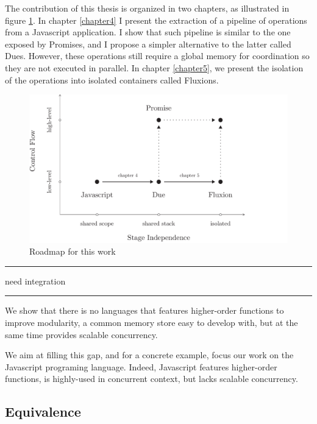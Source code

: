 The contribution of this thesis is organized in two chapters, as illustrated in figure \ref{fig:chapter3:objectives:roadmap}.
In chapter \ref{chapter4} I present the extraction of a pipeline of operations from a Javascript application.
I show that such pipeline is similar to the one exposed by Promises, and I propose a simpler alternative to the latter called Dues.
However, these operations still require a global memory for coordination so they are not executed in parallel.
In chapter \ref{chapter5}, we present the isolation of the operations into isolated containers called Fluxions. 

\begin{figure}[h!]
\includegraphics[width=1\textwidth]{../ressources/roadmap.pdf}
\caption{Roadmap for this work}
\label{fig:chapter3:objectives:roadmap}
\end{figure}

\begin{center}
\rule{3cm}{0.4pt}
need integration
\rule{3cm}{0.4pt}
\end{center}

We show that there is no languages that features higher-order functions to improve modularity, a common memory store easy to develop with, but at the same time provides scalable concurrency.

We aim at filling this gap, and for a concrete example, focus our work on the Javascript programing language.
Indeed, Javascript features higher-order functions, is highly-used in concurrent context, but lacks scalable concurrency.








\subsection{Equivalence}


